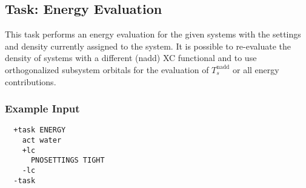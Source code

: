 \subsection{Task: Energy Evaluation}\label{task: energy eval}
This task performs an energy evaluation for the given systems with the settings
and density currently assigned to the system. It is possible to re-evaluate the density
of systems with a different (nadd) XC functional and to use orthogonalized subsystem 
orbitals for the evaluation of $T_s^\text{nadd}$ or all energy contributions.
\subsubsection{Example Input}
\begin{lstlisting}
  +task ENERGY
    act water
    +lc
      PNOSETTINGS TIGHT
    -lc
  -task
\end{lstlisting}

